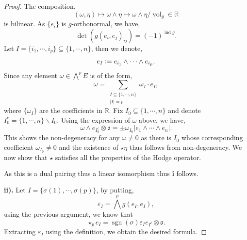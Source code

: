 \documentclass[8pt]{article}
\DeclareMathOperator{\ind}{ind}
\DeclareMathOperator{\sgn}{sgn}
\DeclareMathOperator{\vol}{vol}
\newcommand{\defeq}{\vcentcolon=}
\newcommand{\R}[0]{\mathbb{R}}
\begin{document}
\begin{proof}
  The composition,
  \begin{equation*}
    (\omega,\eta)\mapsto\omega\wedge\eta\mapsto \omega\wedge\eta/\vol_g\in\R
  \end{equation*}
  is bilinear. As $\{e_i\}$ is $g$-orthonormal, we have,
  \begin{equation*}
    \det(g(e_i,e_j)_{ij}) = (-1)^{\ind g}.
  \end{equation*}
  Let $I = \{i_1,\cdots,i_p\}\subseteq\{1,\cdots,n\}$, then we denote,
  \begin{equation*}
    e_I\defeq e_{i_1}\wedge\cdots\wedge e_{i_p}.
  \end{equation*}
  Since any element $\omega\in\bigwedge^pE$ is of the form,
  \begin{equation*}
    \omega = \sum_{\substack{I\subseteq\{1,\cdots,n\}\\\vert I \vert = p}}\omega_I\cdot e_I, 
  \end{equation*}
  where $\{\omega_I\}$ are the coefficients in $\R$.
Fix $I_0\subseteq\{1,\cdots,n\}$ and denote $I_0^c = \{1,\cdots,n\}\backslash I_0$. Using the expression of $\omega$ above, we have,
\begin{equation*}
  \omega\wedge e_{I_0^c}\otimes\mathfrak{o} = \pm\omega_{I_0}\vert e_1\wedge\cdots\wedge e_n\vert.
\end{equation*}
This shows the non-degeneracy for any $\omega\not=0$ as there is $I_0$ whose corresponding coefficient $\omega_{I_0}\not=0$ and the existence of $\star\eta$ thus follows from non-degeneracy. We now show that $\star$ satisfies all the properties of the Hodge operator.
\par As this is a dual pairing thus a linear isomorphism thus \textbf{i} follows.
\par\textbf{ii).}
Let $I = \{\sigma(1),\cdots,\sigma(p)\}$, by putting,
\begin{equation*}
  \varepsilon_I = \bigwedge^pg(e_I,e_I), 
\end{equation*}
using the previous argument, we know that 
\begin{equation*}
  \star_p e_I = \sgn(\sigma)\varepsilon_I e_{I^c}\otimes\mathfrak{o}.
\end{equation*} 
Extracting $\varepsilon_I$ using the definition, we obtain the desired formula.

\end{proof}
\end{document}
